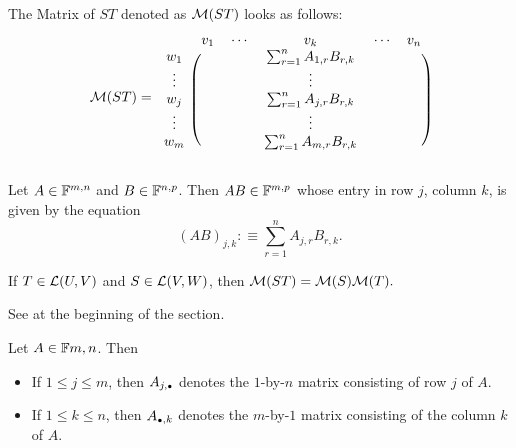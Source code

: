 The Matrix of $ST$ denoted as $\mathcal{M}(ST)$ looks as follows:
\begin{equation}
  \mathcal{M} (ST) =
  \begin{blockarray}{cccccc}
             & v_1 & \cdots &  v_k      & \cdots & v_n \\
    \begin{block}{c(ccccc)}
      w_1    &     &        &  
        \sum_{r=1}^{n} A_{1,r}  B_{r,k} &        &     \\
      \vdots &     &        &  \vdots   &        &     \\
      w_j    &     &        &  
        \sum_{r=1}^{n} A_{j,r}  B_{r,k} &        &     \\
      \vdots &     &        &  \vdots   &        &     \\
      w_m    &     &        &  
        \sum_{r=1}^{n} A_{m,r}  B_{r,k} &        &     \\
    \end{block}
  \end{blockarray}
\end{equation}

\setcounter{thm}{40}
\begin{mydef} 
  \label{def: matrix multiplication}
  Let $A \in \mathbb{F}^{m,n}$ and $B \in \mathbb{F}^{n,p}$. Then $AB \in \mathbb{F}^{m,p}$ whose entry in row $j$, column $k$, is given by the equation
  \begin{equation}
    (AB)_{j,k} :\equiv \sum_{r=1}^{n} A_{j,r} B_{r,k}.
  \end{equation} %
\end{mydef}

\setcounter{thm}{42}
\begin{thm}
  If $T \in \mathcal{L}(U,V)$ and $S\in \mathcal{L}(V,W)$, then $\mathcal{M}(ST) = \mathcal{M}(S) \mathcal{M}(T).$
\end{thm}
\begin{prf}
  See at the beginning of the section.
\end{prf}

\begin{mydef}  Let $A\in \mathbb{F}{m,n}$. Then
  \begin{itemize}
    \item If $1 \leq j \leq m$, then $A_{j, \mathsmaller{\bullet}}$ denotes the $1$-by-$n$ matrix consisting of row $j$ of $A$. 
    \item If $1 \leq k \leq n$, then  $A_{\mathsmaller{\bullet}, k}$ denotes the $m$-by-$1$ matrix consisting of the column $k$ of $A$.
  \end{itemize}
\end{mydef}

